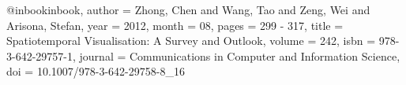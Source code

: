 @inbook{inbook,
author = {Zhong, Chen and Wang, Tao and Zeng, Wei and Arisona, Stefan},
year = {2012},
month = {08},
pages = {299 - 317},
title = {Spatiotemporal Visualisation: A Survey and Outlook},
volume = {242},
isbn = {978-3-642-29757-1},
journal = {Communications in Computer and Information Science},
doi = {10.1007/978-3-642-29758-8_16}
}